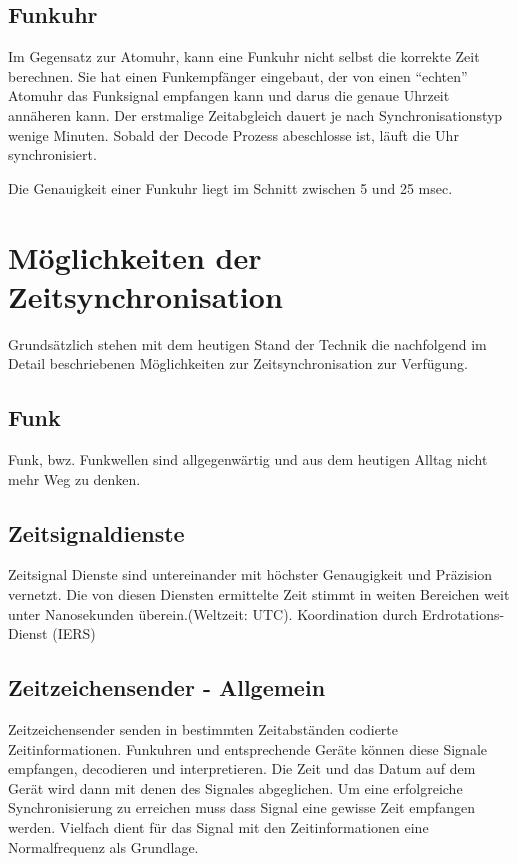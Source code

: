\subsection{Funkuhr}
Im Gegensatz zur Atomuhr, kann eine Funkuhr nicht selbst die korrekte Zeit berechnen. Sie hat einen Funkempfänger eingebaut, der von einen "`echten"' Atomuhr das Funksignal empfangen kann und darus die genaue Uhrzeit annäheren kann. Der erstmalige Zeitabgleich dauert je nach Synchronisationstyp wenige Minuten. Sobald der Decode Prozess abeschlosse ist, läuft die Uhr synchronisiert.

Die Genauigkeit einer Funkuhr liegt im Schnitt zwischen 5 und 25 msec.


\section{Möglichkeiten der Zeitsynchronisation}
Grundsätzlich stehen mit dem heutigen Stand der Technik die nachfolgend im Detail beschriebenen Möglichkeiten zur Zeitsynchronisation zur Verfügung.

\subsection{Funk}
Funk, bwz. Funkwellen sind allgegenwärtig und aus dem heutigen Alltag nicht mehr Weg zu denken.

\subsection{Zeitsignaldienste}
Zeitsignal Dienste sind untereinander mit höchster Genaugigkeit und Präzision vernetzt. Die von diesen Diensten ermittelte Zeit stimmt in weiten Bereichen weit unter Nanosekunden überein.(Weltzeit: UTC). Koordination durch Erdrotations-Dienst (IERS)

\subsection{Zeitzeichensender - Allgemein}
Zeitzeichensender senden in bestimmten Zeitabständen codierte Zeitinformationen. Funkuhren und entsprechende Geräte können diese Signale empfangen, decodieren und interpretieren. Die Zeit und das Datum auf dem Gerät wird dann mit denen des Signales abgeglichen. Um eine erfolgreiche Synchronisierung zu erreichen muss dass Signal eine gewisse Zeit empfangen werden. Vielfach dient für das Signal mit den Zeitinformationen eine Normalfrequenz als Grundlage.

